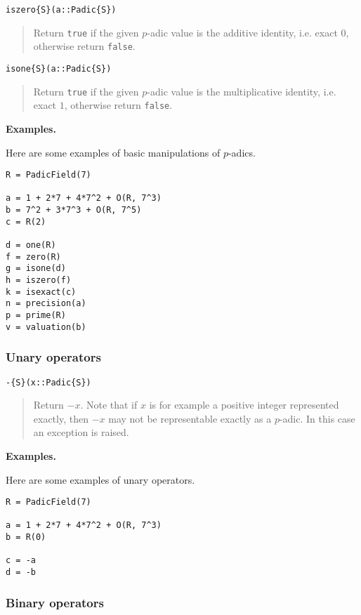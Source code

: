 \documentclass[a4paper,10pt]{article}
\newcommand{\code}{\lstinline}
\newcommand{\desc}[1]{\vspace{-3mm}\begin{quote}#1\end{quote}}
\begin{document}
{{\begin{lstlisting}
iszero{S}(a::Padic{S})
\end{lstlisting}

\desc{Return \code{true} if the given $p$-adic value is the additive identity,
i.e. exact $0$, otherwise return \code{false}.}

\begin{lstlisting}
isone{S}(a::Padic{S})
\end{lstlisting}

\desc{Return \code{true} if the given $p$-adic value is the multiplicative
identity, i.e. exact $1$, otherwise return \code{false}.}

\textbf{Examples.}

Here are some examples of basic manipulations of $p$-adics.

\begin{lstlisting}
R = PadicField(7)

a = 1 + 2*7 + 4*7^2 + O(R, 7^3)
b = 7^2 + 3*7^3 + O(R, 7^5)
c = R(2)

d = one(R)
f = zero(R)
g = isone(d)
h = iszero(f)
k = isexact(c)
n = precision(a)
p = prime(R)
v = valuation(b)
\end{lstlisting}

\subsubsection{Unary operators}

\begin{lstlisting}
-{S}(x::Padic{S})
\end{lstlisting}

\desc{Return $-x$. Note that if $x$ is for example a positive integer
represented exactly, then $-x$ may not be representable exactly as a $p$-adic.
In this case an exception is raised.}

\textbf{Examples.}

Here are some examples of unary operators.

\begin{lstlisting}
R = PadicField(7)

a = 1 + 2*7 + 4*7^2 + O(R, 7^3)
b = R(0)

c = -a
d = -b
\end{lstlisting}

\subsubsection{Binary operators}

}}
\end{document}

